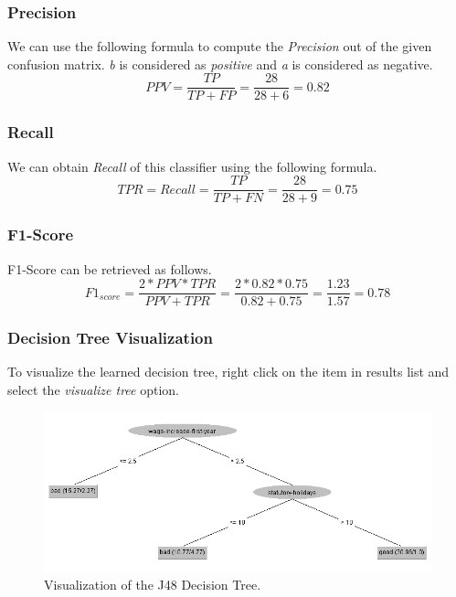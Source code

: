 \documentclass[12pt]{article}
\numberwithin{equation}{section}
\numberwithin{table}{section}
\numberwithin{figure}{section}
\begin{document}
\subsubsection{Precision}
We can use the following formula to compute the \textit{Precision} out of the given confusion matrix. \textit{b} is considered as \textit{positive} and \textit{a} is considered as negative.
$$
	PPV = \frac{TP}{TP + FP} = \frac{28}{28 + 6} = 0.82
$$

\subsubsection{Recall}
We can obtain \textit{Recall} of this classifier using the following formula.
$$
	TPR = Recall = \frac{TP}{TP + FN} = \frac{28}{28 + 9} = 0.75
$$

\subsubsection{F1-Score}
F1-Score can be retrieved as follows. 
$$
	F1_{score} = \frac{2 * PPV * TPR}{PPV + TPR} = \frac{2 * 0.82 * 0.75}{0.82 + 0.75} = \frac{1.23}{1.57} = 0.78
$$

\subsubsection{Decision Tree Visualization}
To visualize the learned decision tree, right click on the item in results list and select the \textit{visualize tree} option.
\begin{figure}[!h]
	\centering
	\includegraphics[scale=1]{2_4.png}
	\caption{Visualization of the J48 Decision Tree.}
	\label{fig:PropProf}
\end{figure}
\end{document}
